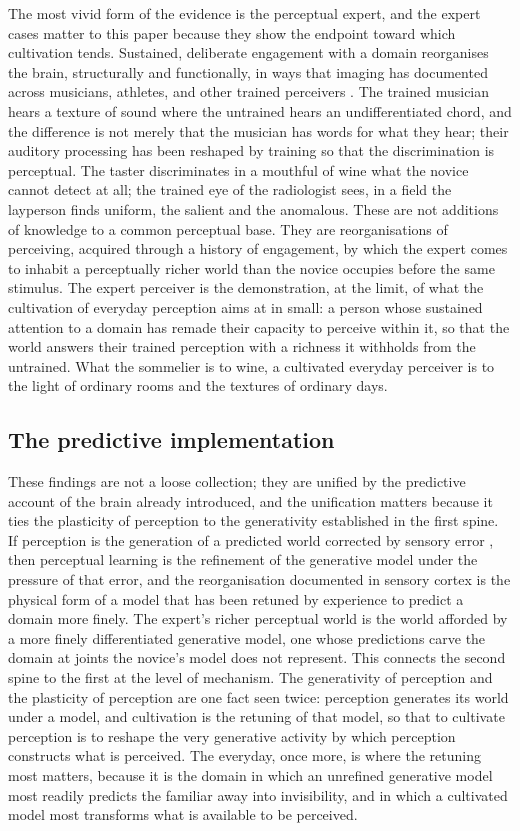 The most vivid form of the evidence is the perceptual expert, and the expert cases matter to this paper because they show the endpoint toward which cultivation tends. Sustained, deliberate engagement with a domain reorganises the brain, structurally and functionally, in ways that imaging has documented across musicians, athletes, and other trained perceivers \parencite{watanabe2015}. The trained musician hears a texture of sound where the untrained hears an undifferentiated chord, and the difference is not merely that the musician has words for what they hear; their auditory processing has been reshaped by training so that the discrimination is perceptual. The taster discriminates in a mouthful of wine what the novice cannot detect at all; the trained eye of the radiologist sees, in a field the layperson finds uniform, the salient and the anomalous. These are not additions of knowledge to a common perceptual base. They are reorganisations of perceiving, acquired through a history of engagement, by which the expert comes to inhabit a perceptually richer world than the novice occupies before the same stimulus. The expert perceiver is the demonstration, at the limit, of what the cultivation of everyday perception aims at in small: a person whose sustained attention to a domain has remade their capacity to perceive within it, so that the world answers their trained perception with a richness it withholds from the untrained. What the sommelier is to wine, a cultivated everyday perceiver is to the light of ordinary rooms and the textures of ordinary days.

\subsection{The predictive implementation}
\label{p23:sub:plas-predictive}

These findings are not a loose collection; they are unified by the predictive account of the brain already introduced, and the unification matters because it ties the plasticity of perception to the generativity established in the first spine. If perception is the generation of a predicted world corrected by sensory error \parencite{friston2010}, then perceptual learning is the refinement of the generative model under the pressure of that error, and the reorganisation documented in sensory cortex is the physical form of a model that has been retuned by experience to predict a domain more finely. The expert's richer perceptual world is the world afforded by a more finely differentiated generative model, one whose predictions carve the domain at joints the novice's model does not represent. This connects the second spine to the first at the level of mechanism. The generativity of perception and the plasticity of perception are one fact seen twice: perception generates its world under a model, and cultivation is the retuning of that model, so that to cultivate perception is to reshape the very generative activity by which perception constructs what is perceived. The everyday, once more, is where the retuning most matters, because it is the domain in which an unrefined generative model most readily predicts the familiar away into invisibility, and in which a cultivated model most transforms what is available to be perceived.

